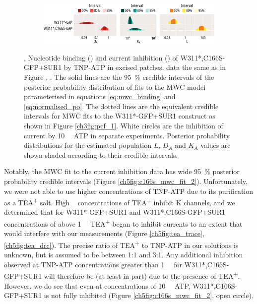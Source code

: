 \begin{figure}[h]
\begin{subfigure}[t]{0.9\textwidth}
		\includegraphics[width=\textwidth]{mwc_c166s_2.pdf}
	\end{subfigure}
	\caption[C166S alters transduction of nucleotide binding to Kir6.2]{
	,  Nucleotide binding () and current inhibition () of W311*,C166S-GFP+SUR1 by TNP-ATP in excised patches, data the same as in Figure , .
	The solid lines are the \SI{95}{\percent} credible intervals of the posterior probability distribution of fits to the MWC model parameterised in equations \ref{eq:mwc_binding} and \ref{eq:normalised_po}.
	The dotted lines are the equivalent credible intervals for MWC fits to the W311*-GFP+SUR1 construct as shown in Figure \ref{ch3fig:pcf_1}.
	White circles are the inhibition of current by \SI{10}{\milli\Molar} ATP in separate experiments.
	 Posterior probability distributions for the estimated population $L$, $D_A$ and $K_A$ values are shown shaded according to their credible intervals.
	}\label{ch5fig:c166s_3}
\end{figure}

Notably, the MWC fit to the current inhibition data has wide \SI{95}{\percent} posterior probability credible intervals (Figure \ref{ch5fig:c166s_mwc_fit_2}).
Unfortunately, we were not able to use higher concentrations of TNP-ATP due to its purification as a TEA\textsuperscript{+} salt.
High \si{\milli\Molar} concentrations of TEA\textsuperscript{+} inhibit K\ATP{} channels, and we determined that for W311*-GFP+SUR1 and W311*,C166S-GFP+SUR1 concentrations of above \SI{1}{\milli\Molar} TEA\textsuperscript{+} began to inhibit currents to an extent that would interfere with our measurements (Figure \ref{ch5fig:tea_trace}, \ref{ch5fig:tea_drc}).
The precise ratio of TEA\textsuperscript{+} to TNP-ATP in our solutions is unknown, but is assumed to be between 1:1 and 3:1.
Any additional inhibition observed at TNP-ATP concentrations greater than \SI{1}{\milli\Molar} for W311*,C166S-GFP+SUR1 will therefore be (at least in part) due to the presence of TEA\textsuperscript{+}.
However, we do see that even at concentrations of \SI{10}{\milli\Molar} ATP, W311*,C166S-GFP+SUR1 is not fully inhibited (Figure \ref{ch5fig:c166s_mwc_fit_2}, open circle).

